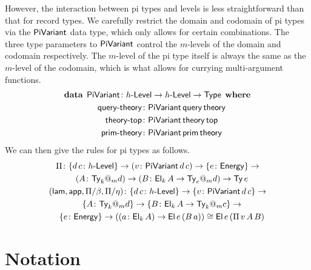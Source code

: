 \documentclass[fleqn,leqno]{article}
\begin{document}
However, the interaction between pi types and levels is less straightforward than that for record types. We carefully restrict the domain and codomain of pi types via the $\mathsf{PiVariant}$ data type, which only allows for certain combinations. The three type parameters to $\mathsf{PiVariant}$ control the $m$-levels of the domain and codomain respectively. The $m$-level of the pi type itself is always the same as the $m$-level of the codomain, which is what allows for currying multi-argument functions.
\begin{gather}
  \mathbf{data}\:\:\mathsf{PiVariant} \colon h\text{-}\mathsf{Level} \to h\text{-}\mathsf{Level} \to \mathsf{Type}\:\:\mathbf{where} \\
  \quad \mathsf{query}\text{-}\mathsf{theory} \colon \mathsf{PiVariant}\,\mathsf{query}\,\mathsf{theory} \\
  \quad \mathsf{theory}\text{-}\mathsf{top} \colon \mathsf{PiVariant}\,\mathsf{theory}\,\mathsf{top} \\
  \quad \mathsf{prim}\text{-}\mathsf{theory} \colon \mathsf{PiVariant}\,\mathsf{prim}\,\mathsf{theory}
\end{gather}
We can then give the rules for pi types as follows.
\begin{gather}
  \Pi \colon \{d\,c \colon h\text{-}\mathsf{Level}\} \to (v \colon \mathsf{PiVariant}\,d\,c) \to \{e \colon \mathsf{Energy}\} \to \\
  \quad (A \colon \mathsf{Ty}_k@_md) \to (B \colon \mathsf{El}_k\,A \to \mathsf{Ty}_e@_md) \to \mathsf{Ty}\,e \\
  (\mathsf{lam},\mathsf{app},\Pi/\beta,\Pi/\eta) \colon \{d\,c \colon h\text{-}\mathsf{Level}\} \to \{v \colon \mathsf{PiVariant}\,d\,c\} \to \\
  \quad \{A \colon \mathsf{Ty}_k@_md\} \to \{B \colon \mathsf{El}_k\,A \to \mathsf{Ty}_k@_mc\} \to \\
  \quad \{e \colon \mathsf{Energy}\} \to ((a \colon \mathsf{El}_k\,A) \to \mathsf{El}\,e\,(B\,a)) \cong \mathsf{El}\,e\,(\Pi\,v\,A\,B)
\end{gather}

\section{Notation} \label{section:notation}



\end{document}
